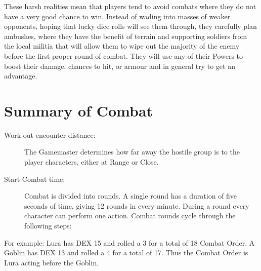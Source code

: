 These harsh realities mean that players tend to avoid combats where they do not have a very good chance to win. Instead of wading into masses of weaker opponents, hoping that lucky dice rolls will see them through, they carefully plan ambushes, where they have the benefit of terrain and supporting soldiers from the local militia that will allow them to wipe out the majority of the enemy before the first proper round of combat. They will use any of their Powers to boost their damage, chances to hit, or armour and in general try to get an advantage.


\section{Summary of Combat}
\begin{description}
	\item[Work out encounter distance:] The Gamemaster determines how far away the hostile group is to the player characters, either at Range or Close.

	\item[Start Combat time:] Combat is divided into rounds. A single round has a duration of five seconds of time, giving 12 rounds in every minute. During a round every character can perform one action. Combat rounds cycle through the following steps:
\end{description}

\begin{rpg-examplebox}
For example: Lura has DEX 15 and rolled a 3 for a total of 18 Combat Order. A Goblin has DEX 13 and rolled a 4 for a total of 17. Thus the Combat Order is Lura acting before the Goblin.
\end{rpg-examplebox}

